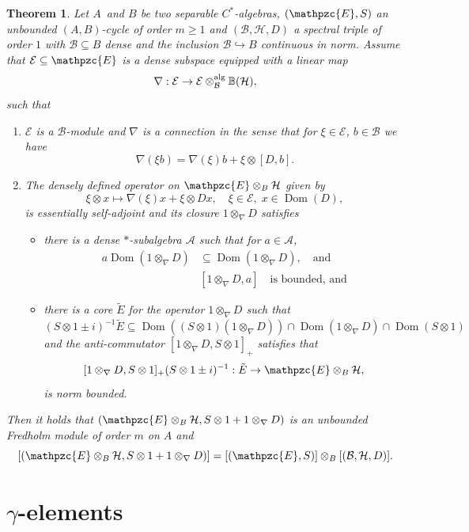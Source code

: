 \documentclass[a4paper,reqno]{amsart}
\numberwithin{equation}{section}
\def\Dom{\operatorname{Dom}}
\newtheorem{thm}{Theorem}[section]
\theoremstyle{definition}
\theoremstyle{remark}
\begin{document}
\begin{thm}
\label{alkdnajdn}
Let $A$ and $B$ be two separable $C^*$-algebras, $(\mathpzc{E},S)$ an unbounded $(A,B)$-cycle of order $m\geq 1$ and $(\mathcal{B},\mathcal{H},D)$ a spectral triple of order $1$ with $\mathcal{B}\subseteq B$ dense and the inclusion   $\mathcal{B}\hookrightarrow B$ continuous in norm. Assume that $\mathcal{E}\subseteq  \mathpzc{E}$ is a dense subspace equipped with a linear map
$$\nabla:\mathcal{E}\to \mathcal{E}\otimes^{\rm alg}_\mathcal{B}\mathbb{B}(\mathcal{H}),$$
such that 
\begin{enumerate}
\item $\mathcal{E}$ is a $\mathcal{B}$-module and $\nabla$ is a connection in the sense that for $\xi\in \mathcal{E}$, $b\in \mathcal{B}$ we have 
$$\nabla(\xi b)=\nabla(\xi)b+\xi\otimes [D,b].$$
\item The densely defined operator on $\mathpzc{E}\otimes_B \mathcal{H}$ given by
$$\xi\otimes x\mapsto \nabla(\xi)x+\xi\otimes Dx, \quad \xi\in \mathcal{E}, \; x\in \Dom(D),$$
is essentially self-adjoint and its closure $1\otimes_\nabla D$ satisfies 
\begin{itemize}
\item there is a dense $*$-subalgebra $\mathcal{A}$ such that for $a\in \mathcal{A}$, 
\begin{align*}
a\Dom(1\otimes_\nabla D)&\subseteq \Dom(1\otimes_\nabla D),\quad\mbox{and}\\
& [1\otimes_\nabla D,a]\quad\mbox{is bounded, and}
\end{align*}
\item there is a core $\tilde{E}$ for the operator $1\otimes_\nabla D$ such that $(S\otimes 1\pm i)^{-1}\tilde{E}\subseteq \Dom ((S\otimes 1)(1\otimes_\nabla D))\cap \Dom(1\otimes_\nabla D)\cap \Dom(S\otimes 1)$ and the anti-commutator $[1\otimes_\nabla D,S\otimes 1]_+$ satisfies that 
$$[1\otimes_\nabla D,S\otimes 1]_+(S\otimes 1\pm i)^{-1}:\tilde{E}\to \mathpzc{E}\otimes_B \mathcal{H},$$
is norm bounded.
\end{itemize}
\end{enumerate}
Then it holds that $(\mathpzc{E}\otimes_B \mathcal{H},S\otimes 1+1\otimes_\nabla D)$ is an unbounded Fredholm module of order $m$ on $A$ and 
$$[(\mathpzc{E}\otimes_B \mathcal{H},S\otimes 1+1\otimes_\nabla D)]=[(\mathpzc{E},S)]\otimes_B[(\mathcal{B},\mathcal{H},D)].$$
\end{thm}




\section{$\gamma$-elements}
\label{subsecgamma}
\end{document}

